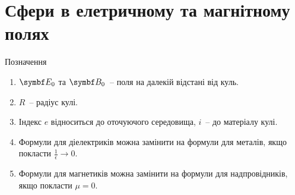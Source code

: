 \clearpage
\section{Сфери в елетричному та магнітному полях}

\begin{center}
	Позначення
\end{center}
\begin{enumerate}\small
	\item $\Efield_0$ та $\Bfield_0$~-- поля на далекій відстані від куль.
	\item $R$~-- радіус кулі.
	\item Індекс $e$ відноситься до оточуючого середовища, $i$~-- до матеріалу кулі.
	\item Формули для діелектриків можна замінити на формули для металів, якщо покласти $\frac{1}{\epsilon} \to 0$.
	\item Формули для магнетиків можна замінити на формули для надпровідників, якщо покласти $\mu = 0$.
\end{enumerate}

